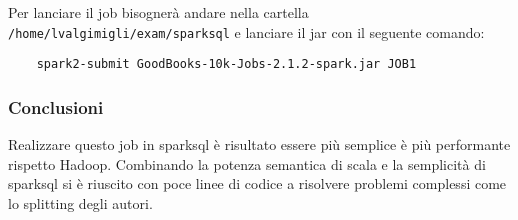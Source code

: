 Per lanciare il job bisognerà andare nella cartella \texttt{/home/lvalgimigli/exam/sparksql} e lanciare il jar con il seguente comando:
\begin{verbatim}
    spark2-submit GoodBooks-10k-Jobs-2.1.2-spark.jar JOB1
\end{verbatim}


\subsubsection{Conclusioni}
Realizzare questo job in sparksql è risultato essere più semplice è più performante rispetto Hadoop. Combinando la potenza semantica di scala e
la semplicità di sparksql si è riuscito con poce linee di codice a risolvere problemi complessi come lo splitting degli autori.
